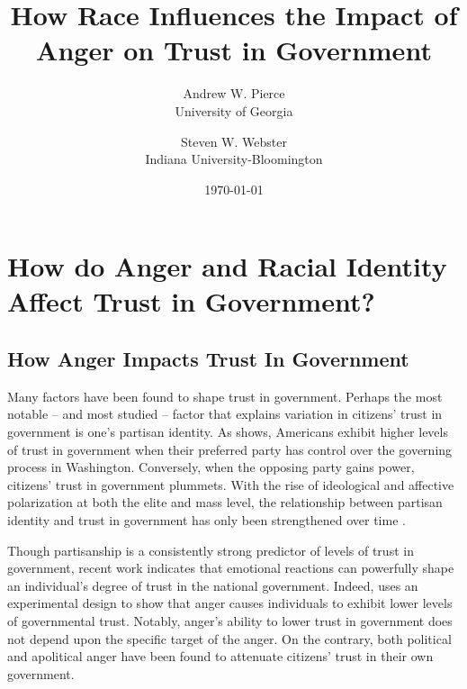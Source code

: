 \documentclass[12t, letterpaper]{article}
\author{Andrew W. Pierce \\ University of Georgia \and Steven W. Webster \\ Indiana University-Bloomington}
\title{How Race Influences the Impact of Anger on Trust in Government}
\date{\today}
\begin{document}
%

\begin{titlepage}
\maketitle

\thispagestyle{empty}

\begin{singlespacing}
\end{singlespacing}

\end{titlepage}


\newpage
\setcounter{page}{1}

\doublespacing

\section{How do Anger and Racial Identity Affect Trust in Government?}
\label{sec:litreview}

\subsection{How Anger Impacts Trust In Government}
\label{subsec:angertrust}

Many factors have been found to shape trust in government. Perhaps the most notable -- and most studied -- factor that explains variation in citizens' trust in government is one's partisan identity. As \citet{citrin1974} shows, Americans exhibit higher levels of trust in government when their preferred party has control over the governing process in Washington. Conversely, when the opposing party gains power, citizens' trust in government plummets. With the rise of ideological and affective polarization at both the elite \citep{hetherington2001, fap2005} and mass \citep{abramowitz2010, bafumi_shapiro2009} level, the relationship between partisan identity and trust in government has only been strengthened over time \citep{hetherington_rudolph2015}.

Though partisanship is a consistently strong predictor of levels of trust in government, recent work indicates that emotional reactions can powerfully shape an individual's degree of trust in the national government. Indeed, \citet{webster2017} uses an experimental design to show that anger causes individuals to exhibit lower levels of governmental trust. Notably, anger's ability to lower trust in government does not depend upon the specific target of the anger. On the contrary, both political and apolitical anger have been found to attenuate citizens' trust in their own government.
\end{document}
